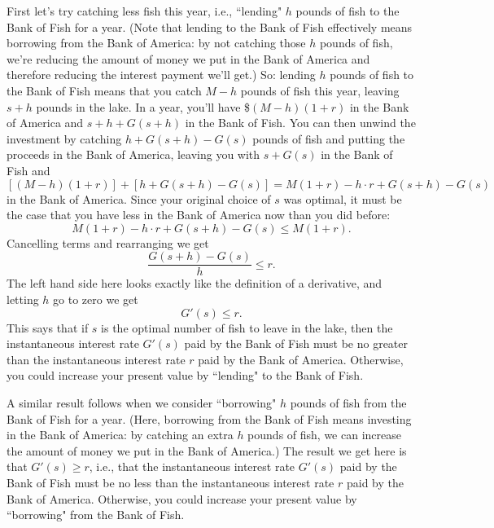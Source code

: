 First let's try catching less fish this year, i.e., ``lending" $h$ pounds of fish to the Bank of Fish for a year. (Note that lending to the Bank of Fish effectively means borrowing from the Bank of America: by not catching those $h$ pounds of fish, we're reducing the amount of money we put in the Bank of America and therefore reducing the interest payment we'll get.) So: lending $h$ pounds of fish to the Bank of Fish means that you catch $M-h$ pounds of fish this year, leaving $s+h$ pounds in the lake. In a year, you'll have \$$(M-h)(1+r)$ in the Bank of America and $s+h + G(s+h)$ in the Bank of Fish. You can then unwind the investment by catching $h+G(s+h)-G(s)$ pounds of fish and putting the proceeds in the Bank of America, leaving you with $s+G(s)$ in the Bank of Fish and
\[
[(M-h)(1+r)]+[h+G(s+h)-G(s)]=M(1+r)-h\cdot r+G(s+h)-G(s)
\]
in the Bank of America. Since your original choice of $s$ was optimal, it must be the case that you have less in the Bank of America now than you did before:
\[
M(1+r)-h\cdot r+G(s+h)-G(s)\leq M(1+r).
\]
Cancelling terms and rearranging we get
\[
\frac{G(s+h)-G(s)}{h} \leq r.
\]
The left hand side here looks exactly like the definition of a derivative, and letting $h$ go to zero we get
\[
G'(s)\leq r.
\]
This says that if $s$ is the optimal number of fish to leave in the lake, then the instantaneous interest rate $G'(s)$ paid by the Bank of Fish must be no greater than the instantaneous interest rate $r$ paid by the Bank of America. Otherwise, you could increase your present value by ``lending" to the Bank of Fish.

A similar result follows when we consider ``borrowing" $h$ pounds of fish from the Bank of Fish for a year. (Here, borrowing from the Bank of Fish means investing in the Bank of America: by catching an extra $h$ pounds of fish, we can increase the amount of money we put in the Bank of America.) The result we get here is that $G'(s)\geq r$, i.e., that the instantaneous interest rate $G'(s)$ paid by the Bank of Fish must be no less than the instantaneous interest rate $r$ paid by the Bank of America. Otherwise, you could increase your present value by ``borrowing" from the Bank of Fish.

